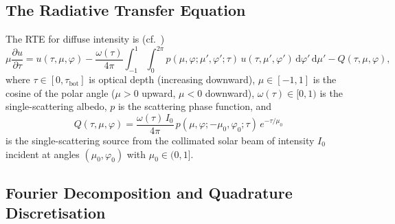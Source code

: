 \documentclass[11pt,a4paper]{article}
\newcommand{\tbot}{\tau_{\mathrm{bot}}}
\newcommand{\dd}{\,\mathrm{d}}
\theoremstyle{definition}
\begin{document}
\subsection{The Radiative Transfer Equation}

The RTE for diffuse intensity is (cf.\ \cite[eq.~(1)]{HP2024doc})
\begin{equation}\label{eq:rte}
  \mu \frac{\partial u}{\partial \tau}
  = u(\tau, \mu, \varphi)
  - \frac{\omega(\tau)}{4\pi}\int_{-1}^{1}\!\int_0^{2\pi}
    p(\mu, \varphi; \mu', \varphi'; \tau)\,
    u(\tau, \mu', \varphi')\dd\varphi'\dd\mu'
  - Q(\tau, \mu, \varphi),
\end{equation}
where $\tau \in [0, \tbot]$ is optical depth (increasing downward),
$\mu \in [-1,1]$ is the cosine of the polar angle ($\mu > 0$ upward,
$\mu < 0$ downward), $\omega(\tau) \in [0,1)$ is the single-scattering
albedo, $p$ is the scattering phase function, and
\begin{equation}\label{eq:beam-source}
  Q(\tau, \mu, \varphi)
  = \frac{\omega(\tau)\, I_0}{4\pi}\,
    p(\mu, \varphi; -\mu_0, \varphi_0; \tau)\,
    e^{-\tau/\mu_0}
\end{equation}
is the single-scattering source from the collimated solar beam of
intensity $I_0$ incident at angles $(\mu_0, \varphi_0)$ with
$\mu_0 \in (0,1]$.

\subsection{Fourier Decomposition and Quadrature Discretisation}
\end{document}
